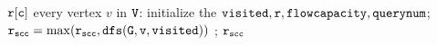 \begin{algorithm}
\begin{algorithmic}[1]
             \STATE {}  $\mathtt{r[c]}$
              every vertex $v$ in $\mathtt{V}$:
             initialize the $\mathtt{visited, r, flowcapacity, querynum}$;
             \STATE  \qquad $\mathtt{r_{scc} = \max(r_{scc}, dfs(G, v, \mathtt{visited} ))}$ ; 
             \RETURN  $\mathtt{r_{scc}}$
             \end{algorithmic}
             \end{algorithm}
 
